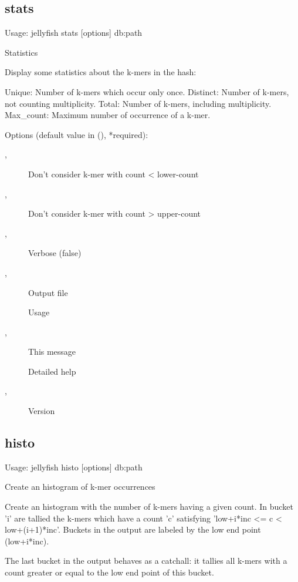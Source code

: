 \subsection{stats}
\noindent Usage: jellyfish stats [options] db:path

\noindent Statistics

\noindent Display some statistics about the k-mers in the hash:

\noindent Unique:    Number of k-mers which occur only once.
\noindent Distinct:  Number of k-mers, not counting multiplicity.
\noindent Total:     Number of k-mers, including multiplicity.
\noindent Max\_count: Maximum number of occurrence of a k-mer.

\noindent Options (default value in (), *required):
\begin{description}
\item[,] \noindent Don't consider k-mer with count < lower-count
\item[,] \noindent Don't consider k-mer with count > upper-count
\item[,] \noindent Verbose (false)
\item[,] \noindent Output file
\item[] \noindent Usage
\item[,] \noindent This message
\item[] \noindent Detailed help
\item[,] \noindent Version
\end{description}
\subsection{histo}
\noindent Usage: jellyfish histo [options] db:path

\noindent Create an histogram of k-mer occurrences

\noindent Create an histogram with the number of k-mers having a given
\noindent count. In bucket 'i' are tallied the k-mers which have a count 'c'
\noindent satisfying 'low+i*inc <= c < low+(i+1)*inc'. Buckets in the output are
\noindent labeled by the low end point (low+i*inc).

\noindent The last bucket in the output behaves as a catchall: it tallies all
\noindent k-mers with a count greater or equal to the low end point of this
\noindent bucket.

